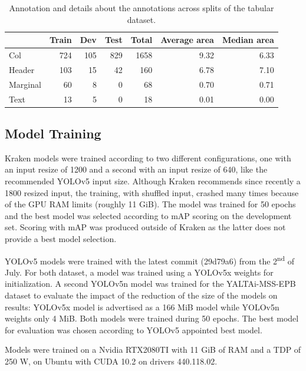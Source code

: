 \documentclass{jdmdh}
\begin{document}
\begin{table}[ht]
    \centering
    \begin{tabular}{l|rrr|r|rr}
    \hline
              &   Train &   Dev &   Test &   Total &   Average area &   Median area \\
    \hline
     Col      &     724 &   105 &    829 &    1658 &           9.32 &          6.33 \\
     Header   &     103 &    15 &     42 &     160 &           6.78 &          7.10 \\
     Marginal &      60 &     8 &      0 &      68 &           0.70 &          0.71 \\
     Text     &      13 &     5 &      0 &      18 &           0.01 &          0.00 \\
    \hline
    \end{tabular}
    \caption{Annotation and details about the annotations across splits of the tabular  dataset.}
    \label{tab:comp:tabular}
\end{table}

\subsection{Model Training}

Kraken models were trained according to two different configurations, one with an input resize of 1200 and a second with an input resize of 640, like the recommended YOLOv5 input size. Although Kraken recommends since recently a 1800 resized input, the training, with shuffled input, crashed many times because of the GPU RAM limits (roughly 11 GiB). The model was trained for 50 epochs and the best model was selected according to mAP scoring on the development set. Scoring with mAP was produced outside of Kraken as the latter does not provide a best model selection.

YOLOv5 models were trained with the latest commit (29d79a6) from the 2\textsuperscript{nd} of July. For both dataset, a model was trained using a YOLOv5x weights for initialization. A second YOLOv5n model was trained for the YALTAi-MSS-EPB dataset to evaluate the impact of the reduction of the size of the models on results: YOLOv5x model is advertised as a 166 MiB model while YOLOv5n weights only 4 MiB. Both models were trained during 50 epochs. The best model for evaluation was chosen according to YOLOv5 appointed best model.

Models were trained on a Nvidia RTX2080TI with 11 GiB of RAM and a TDP of 250 W, on Ubuntu with CUDA 10.2 on drivers 440.118.02.
\end{document}
